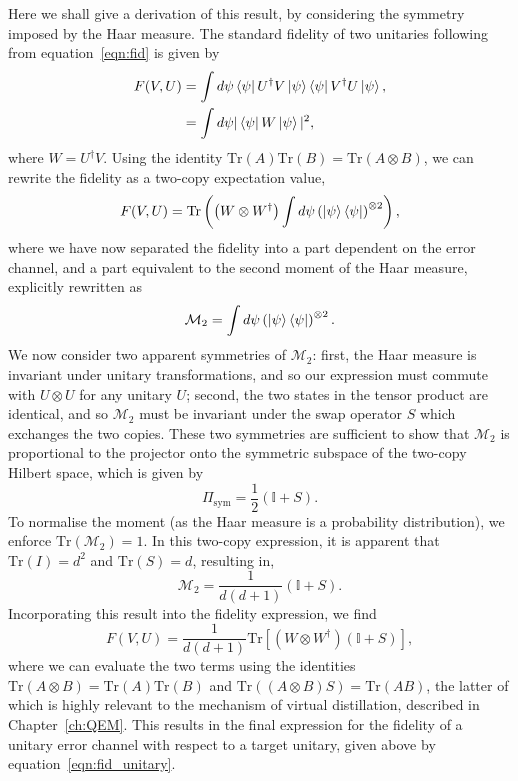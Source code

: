 Here we shall give a derivation of this result, by considering the symmetry imposed by the Haar measure.
The standard fidelity of two unitaries following from equation~\ref{eqn:fid} is given by
\begin{equation}
\begin{split}
    F(V,U) &= \int d\psi \bra{\psi} U^\dagger V \ket{\psi}\bra{\psi} V^\dagger U \ket{\psi},\\
    &= \int d\psi |\bra{\psi} W \ket{\psi}|^2,\\
\end{split}
\end{equation}
where $W=U^\dagger V$.
Using the identity $\text{Tr}(A)\text{Tr}(B) = \text{Tr}(A\otimes B)$, we can rewrite the fidelity as a two-copy expectation value,
\begin{equation}
    F(V,U) = \text{Tr}\left( \left(W \otimes W^\dagger\right) \int d\psi \left(\ket{\psi}\bra{\psi}\right)^{\otimes 2}\right),
\end{equation}
where we have now separated the fidelity into a part dependent on the error channel, and a part equivalent to the second moment of the Haar measure, explicitly rewritten as
\begin{equation}
    \mathcal{M}_2 = \int d\psi \left(\ket{\psi}\bra{\psi}\right)^{\otimes 2}.
\end{equation}
We now consider two apparent symmetries of $\mathcal{M}_2$: first, the Haar measure is invariant under unitary transformations, and so our expression must commute with $U \otimes U$ for any unitary $U$; second, the two states in the tensor product are identical, and so $\mathcal{M}_2$ must be invariant under the swap operator $S$ which exchanges the two copies. These two symmetries are sufficient to show that $\mathcal{M}_2$ is proportional to the projector onto the symmetric subspace of the two-copy Hilbert space, which is given by
\begin{equation}
    \Pi_{\text{sym}} = \frac{1}{2}(\mathbb{I} + S).
\end{equation}
To normalise the moment (as the Haar measure is a probability distribution), we enforce $\text{Tr}(\mathcal{M}_2) = 1$. In this two-copy expression, it is apparent that $\text{Tr}(I) = d^2$ and $\text{Tr}(S) = d$, resulting in,
\begin{equation}
    \mathcal{M}_2 = \frac{1}{d(d+1)} \left(\mathbb{I} + S\right). 
\end{equation}
Incorporating this result into the fidelity expression, we find
\begin{equation}
    F(V,U) = \frac{1}{d(d+1)} \text{Tr}\left[ (W \otimes W^\dagger)(\mathbb{I} + S) \right],
\end{equation}
where we can evaluate the two terms using the identities $\text{Tr}(A \otimes B) = \text{Tr}(A)\text{Tr}(B)$ and $\text{Tr}((A \otimes B)S) = \text{Tr}(AB)$, the latter of which is highly relevant to the mechanism of virtual distillation, described in Chapter~\ref{ch:QEM}. This results in the final expression for the fidelity of a unitary error channel with respect to a target unitary, given above by equation~\ref{eqn:fid_unitary}.


